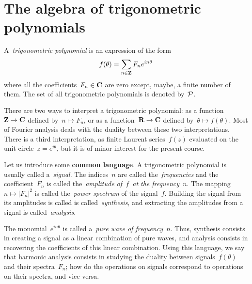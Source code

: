 \clearpage
\section{The algebra of trigonometric polynomials}


\begin{definition}
A~\emph{trigonometric polynomial} is an expression of the form
$$
	f(\theta)=\sum_{n\in\mathbf{Z}} F_n e^{in\theta}
$$
where all the coefficients~$F_n\in\mathbf{C}$ are zero except, maybe, a finite
number of them.  The set of all trigonometric polynomials is denoted
by~$\mathcal{P}$.
\end{definition}

There are two ways to interpret a trigonometric polynomial: as a
function~$\mathbf{Z}\to\mathbf{C}$ defined by~$n\mapsto F_n$, or as a function~$\mathbf{R}\to\mathbf{C}$
defined by~$\theta\mapsto f(\theta)$.
Most of Fourier analysis deals with
the duality between these two interpretations.
There is a third interpretation, as finite Laurent series~$f(z)$ evaluated on
the unit circle~$z=e^{i\theta}$, but it is of minor interest for the present
course.

Let us introduce some {\bf common language}.
A trigonometric polynomial is usually called a~\emph{signal}.  The
indices~$n$ are called the~\emph{frequencies} and the coefficient~$F_n$
is called the~\emph{amplitude of~$f$~at the frequency~$n$}.  The
mapping~$n\mapsto\left|F_n\right|^2$ is called the~\emph{power
spectrum} of the signal~$f$.  Building the signal from its amplitudes
is called is called~\emph{synthesis}, and extracting the amplitudes
from a signal is called~\emph{analysis}.

The monomial~$e^{in\theta}$ is called a~\emph{pure wave of frequency~$n$}.
Thus, synthesis consists in creating a signal as a linear combination of pure
waves, and analysis consists in recovering the coefficients of this linear
combination.  Using this language, we say that harmonic analysis consists in
studying the duality between signals~$f(\theta)$ and their spectra~$F_n$; how
do the operations on signals correspond to operations on their spectra, and
vice-versa.



